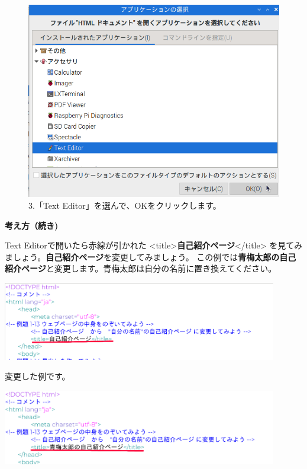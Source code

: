 \documentclass[a4paper,12pt]{jarticle}
\begin{document}
\begin{figure}[ht]
\begin{minipage}{\textwidth}
    \begin{minipage}{0.45\linewidth}
      \includegraphics[width=\linewidth]{textbook-img1042.png}\\
      3.「Text Editor」を選んで、OKをクリックします。
    \end{minipage}
  \end{minipage}


\end{figure}

\clearpage
\textbf{考え方（続き)}

Text Editorで開いたら赤線が引かれた
{\textless}title{\textgreater}\textbf{自己紹介ページ}{\textless}/title{\textgreater}
を見てみましょう。\textbf{自己紹介ページ}を変更してみましょう。
この例では\textbf{青梅太郎の自己紹介ページ}と変更します。青梅太郎は自分の名前に置き換えてください。


\centering
\includegraphics[width=0.9\textwidth]{textbook-img146.png}



\bigskip

\flushleft
変更した例です。

\centering
\includegraphics[width=0.9\textwidth]{textbook-img148.png}
\end{document}
